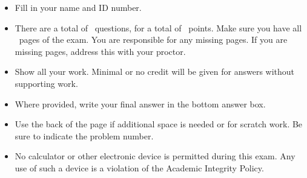 \documentclass[12pt,letterpaper]{exam}
\begin{document}
\titleinfo
\directions
\begin{itemize}
\item Fill in your name and ID number.
\item There are a total of \numquestions\ questions, for a total of \numpoints~points. Make sure you have all \numpages\ pages of the exam. You are responsible for any missing pages. If you are missing pages, address this with your proctor. 
\item Show all your work. Minimal or no credit will be given for answers without supporting work.
\item Where provided, write your final answer in the bottom answer box. 
\item Use the back of the page if additional space is needed or for scratch work. Be sure to indicate the problem number.
\item No calculator or other electronic device is permitted during this exam. Any use of such a device is a violation of the Academic Integrity Policy. 
\end{itemize}

\noticeline
\scores
\bottomline

\newpage
\end{document}
